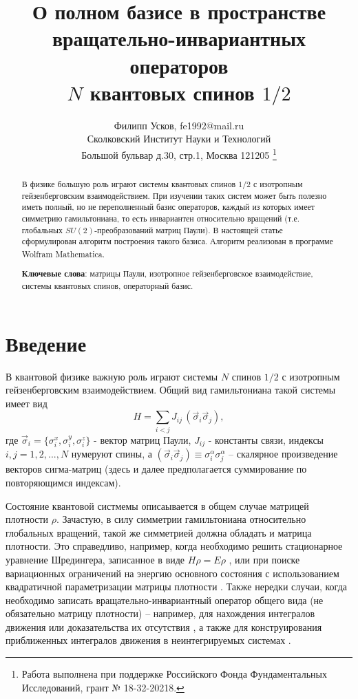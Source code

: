\documentclass[]{article}
\title{О полном базисе  в пространстве \\ вращательно-инвариантных операторов \\ $N$ квантовых спинов $1/2$}
\author{Филипп Усков, fe1992@mail.ru\\ {\small Сколковский Институт Науки и Технологий}\\
{\small Большой бульвар д.30, стр.1,
Москва 121205}
\footnote{
Работа выполнена при поддержке Российского Фонда Фундаментальных Исследований, грант № 18-32-20218.
}
}
\renewcommand{\[}{\begin{equation}}
\renewcommand{\]}{\end{equation}}
\begin{document}
\maketitle

\begin{abstract}
В физике большую роль играют системы квантовых спинов $1/2$ с изотропным гейзенберговским взаимодействием. При изучении таких систем может быть полезно иметь полный, но не переполненный базис операторов, каждый из которых имеет симметрию гамильтониана, то есть инвариантен относительно вращений (т.е. глобальных $SU(2)$-преобразований матриц Паули).	
В настоящей статье сформулирован алгоритм построения такого базиса. Алгоритм реализован в программе Wolfram Mathematica\textsuperscript{\textcopyright}.

{\bf Ключевые слова}: матрицы Паули, изотропное гейзенберговское взаимодействие, системы квантовых спинов, операторный базис.
\end{abstract}

\section{Введение}

В квантовой физике важную роль играют системы $N$ спинов $1/2$ с изотропным гейзенберговским взаимодействием. Общий вид гамильтониана такой системы имеет вид
$$
H=\sum_{i< j}J_{ij}\,(\vec\sigma_i\vec\sigma_j),
$$
где $\vec\sigma_i = \{\sigma_i^x,\sigma_i^y,\sigma_i^z\}$ - вектор матриц Паули, $J_{ij}$ - константы связи,   индексы $i,j=1,2,...,N$ нумеруют спины, а $(\vec\sigma_i\vec\sigma_j)\equiv \sigma_i^\alpha \sigma_j^\alpha$ -- скалярное произведение векторов сигма-матриц (здесь и далее предполагается суммирование по повторяющимся индексам).

Состояние квантовой  систмемы описаывается в общем случае матрицей плотности $\rho$. Зачастую, в силу симметрии гамильтониана относительно глобальных вращений, такой же симметрией должна обладать и матрица плотности. Это справедливо, например, когда необходимо решить стационарное уравнение Шредингера, записанное в виде $ H\rho = E\rho $ \cite{USH}, или при поиске вариационных ограничений на энергию основного состояния \cite{variational} с использованием квадратичной параметризации матрицы плотности \cite{kvadro}.   Также нередки случаи, когда необходимо записать вращательно-инвариантный оператор общего вида (не обязательно матрицу плотности) -- например, для нахождения интегралов движения \cite{basisF} или доказательства их отсутствия \cite{Shiraishi}, а также для конструирования приближенных интегралов движения в неинтегрируемых системах \cite{Malikis}.  
\end{document}

